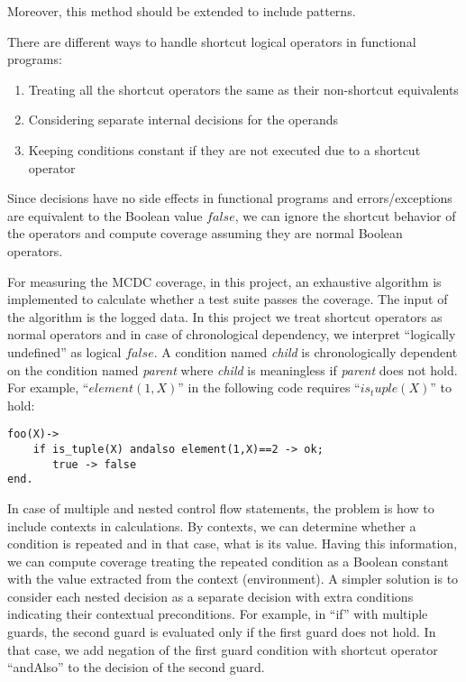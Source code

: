 \documentclass[12pt,a4paper]{report}
\begin{document}
Moreover, this method should be extended to include patterns.

There are different ways to handle shortcut logical operators in functional programs:

\begin{enumerate}
 \item Treating all the shortcut operators the same as their non-shortcut equivalents
 \item Considering separate internal decisions for the operands\cite{DO-248B} 
 \item Keeping conditions constant if they are not executed due to a shortcut operator\cite{chilenski1994applicability}
\end{enumerate}
 
Since decisions have no side effects in functional programs and errors/exceptions are equivalent to the Boolean value $false$, we can ignore the shortcut behavior of the operators and compute coverage assuming they are normal Boolean operators.  
 
For measuring the MCDC coverage, in this project, an exhaustive algorithm is implemented to calculate whether a test suite passes the coverage. The input of the algorithm is the logged data. In this project we treat shortcut operators as normal operators and in case of chronological dependency, we interpret ``logically undefined'' as logical $false$. A condition named \emph{child} is chronologically dependent on the condition named \emph{parent} where \emph{child} is meaningless if \emph{parent} does not hold. For example, ``$element(1,X)$'' in the following code requires ``$is_tuple(X)$'' to hold:

\begin{lstlisting}
foo(X)->
    if is_tuple(X) andalso element(1,X)==2 -> ok;
       true -> false
end.
\end{lstlisting} 

In case of multiple and nested control flow statements, the problem is how to include contexts in calculations. By contexts, we can determine whether a condition is repeated and in that case, what is its value. Having this information, we can compute coverage treating the repeated condition as a Boolean constant with the value extracted from the context (environment). A simpler solution is to consider each nested decision as a separate decision with extra conditions indicating their contextual preconditions. For example, in ``if'' with multiple guards, the second guard is evaluated only if the first guard does not hold. In that case, we add negation of the first guard condition with shortcut operator ``andAlso'' to the decision of the second guard.
\end{document}
